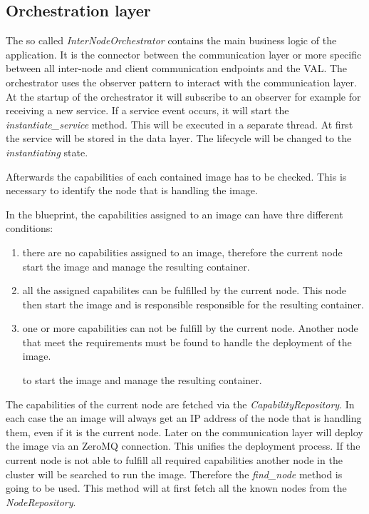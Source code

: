 \subsection{Orchestration layer}
The so called \textit{InterNodeOrchestrator} contains the main business logic of the application.
It is the connector between the communication layer or more specific between all inter-node and client communication endpoints and the \ac{VAL}.
The orchestrator uses the observer pattern to interact with the communication layer.
At the startup of the orchestrator it will subscribe to an observer for example for receiving a new service.
If a service event occurs, it will start the \textit{instantiate\_service} method.
This will be executed in a separate thread.
At first the service will be stored in the data layer.
The lifecycle will be changed to the \textit{instantiating} state.\newline

Afterwards the capabilities of each contained image has to be checked.
This is necessary to identify the node that is handling the image.\newline

In the blueprint, the capabilities assigned to an image can have thre different conditions:
\begin{enumerate}
  \item there are no capabilities assigned to an image, therefore the current node start the image and manage the resulting container.
  \item all the assigned capabilites can be fulfilled by the current node. This node then start the image and is responsible responsible for the resulting container.
  \item one or more capabilities can not be fulfill by the current node. Another node that meet the requirements must be found to handle the deployment of the image.

   to start the image and manage the resulting container.
\end{enumerate}
\bigskip

The capabilities of the current node are fetched via the \textit{CapabilityRepository}.
In each case the an image will always get an \ac{IP} address of the node that is handling them, even if it is the current node.
Later on the communication layer will deploy the image via an ZeroMQ connection.
This unifies the deployment process.
If the current node is not able to fulfill all required capabilities another node in the cluster will be searched to run the image.
Therefore the \textit{find\_node} method is going to be used.
This method will at first fetch all the known nodes from the \textit{NodeRepository}.\newline

